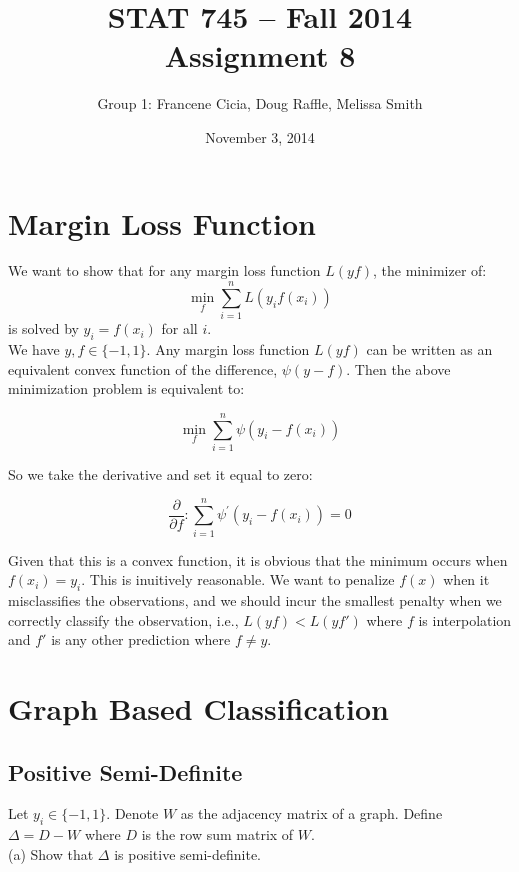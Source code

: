 \documentclass[a4paper]{article}
\title{\vspace{-30pt}STAT 745 -- Fall 2014\\Assignment 8}
\author{Group 1: Francene Cicia, Doug Raffle, Melissa Smith}
\date{November 3, 2014}
\begin{document}
\setlength{\parindent}{0pt}
\vspace{-50pt}
\maketitle

\section{Margin Loss Function}

We want to show that for any margin loss function $L(yf)$, the minimizer of:
$$\min_f \sum_{i=1}^{n} L(y_i f(x_i))$$
is solved by $y_i=f(x_i)$ for all $i$.\\

We have $y,f \in \{-1,1\}$. Any margin loss function $L(yf)$ can be written as an equivalent
convex function of the difference,
$\psi(y-f)$. Then the above minimization problem is equivalent to: 

$$\min_f \sum_{i=1}^{n} \psi(y_i - f(x_i))$$

So we take the derivative and set it equal to zero:

$$ \frac{\partial}{\partial f}: \sum_{i=1}^{n} \psi ^{'}(y_i -f(x_i))=0$$

Given that this is a convex function, it is obvious that the minimum 
occurs when $f(x_i) = y_i$.  This is inuitively reasonable.  We want
to penalize $f(x)$ when it misclassifies the observations, and we
should incur the smallest penalty when we correctly classify the
observation, i.e., $L(yf) < L(yf')$ where $f$ is interpolation and
$f'$ is any other prediction where $f \ne y$.


\section{Graph Based Classification}

\subsection{Positive Semi-Definite}
Let $y_{i} \in \{-1,1\}$. Denote $W$ as the adjacency matrix of a
graph. Define $\Delta = D - W$ where $D$ is the row sum matrix of
$W$.\\ 
(a) Show that $\Delta$ is positive semi-definite.\\
\end{document}

